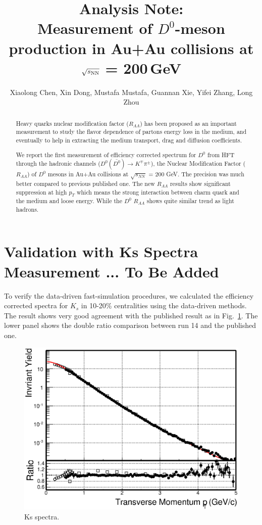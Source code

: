 \documentclass[a4paper]{article}
\title{Analysis Note: \\
Measurement of $D^0$-meson production in Au+Au collisions at $\sqrt{s_{\rm NN}}$ = 200\,GeV}
\author{Xiaolong Chen, Xin Dong, Mustafa Mustafa, Guannan Xie, Yifei Zhang, Long Zhou}
\begin{document}
\maketitle

\begin{abstract}

Heavy quarks nuclear modification factor ($R_{AA}$) has been proposed as an important measurement to study the flavor dependence of partons energy loss in the medium, and eventually to help in extracting the medium transport, drag and diffusion coefficients.

We report the first measurement of efficiency corrected spectrum for $D^0$ from HFT through the hadronic channels ($D^0(\bar{D^0}) \rightarrow K^{\mp}\pi^{\pm}$), the Nuclear Modification Factor ($R_{AA}$) of $D^0$ mesons in Au+Au collisions at $\sqrt{s_{NN}}$ = 200 GeV. The precision was much better compared to previous published one. The new $R_{AA}$ results show significant suppression at high $p_T$ which means the strong interaction between charm quark and the medium and loose energy. While the $D^0$ $R_{AA}$ shows quite similar trend as light hadrons.

\end{abstract}

\clearpage

\tableofcontents








\section{Validation with Ks Spectra Measurement ... To Be Added}
 To verify the data-driven fast-simulation procedures, we calculated the efficiency corrected spectra for $K_{s}$ in 10-20\% centralities using the data-driven methods. The result shows very good agreement with the published result as in Fig.~\ref{Ks_spectra}. The lower panel shows the double ratio comparison between run 14 and the published one.

\begin{figure}
\centering
\includegraphics[width=0.7\columnwidth]{figure/Run14_D0HFT/Ks_spectra_PtCut_0.eps}
\caption{Ks spectra.}
\label{Ks_spectra}
\end{figure}
\end{document}
